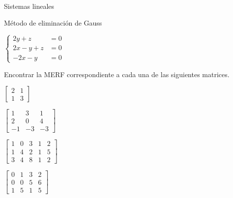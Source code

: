 \begin{chapter}{Sistemas lineales}
\begin{section}{Método de eliminación de Gauss }
\begin{enumex}
\begin{enumex}
                            \item \; $\begin{cases}
                                2 y + z &= 0 \\
                                2x- y + z &= 0 \\
                                -2x -y &=0
                            \end{cases}$
                        \end{enumex}

                    \item 
                    Encontrar la MERF  correspondiente a cada una de las siguientes matrices. 
                        \begin{enumex}
                            \begin{minipage}{0.4\textwidth}
                                \item $\begin{bmatrix}
                                    2&1\\1&3
                                \end{bmatrix}$
                            \end{minipage}
                            \begin{minipage}{0.4\textwidth}
                                \item $\begin{bmatrix}
                                    1&3&1\\2&0&4\\-1&-3&-3
                                \end{bmatrix}$
                            \end{minipage}

                            \begin{minipage}{0.4\textwidth}
                                \item $\begin{bmatrix}
                                    1&0&3&1&2\\1&4&2&1&5\\3&4&8&1&2
                                \end{bmatrix}$
                            \end{minipage}
                            \begin{minipage}{0.4\textwidth}
                                \item $\begin{bmatrix}
                                    0&1&3&2\\0&0&5&6\\1&5&1&5
                                \end{bmatrix}$
                            \end{minipage}
                        \end{enumex}
                \end{enumex}
        \end{section}

    \end{chapter}
        
